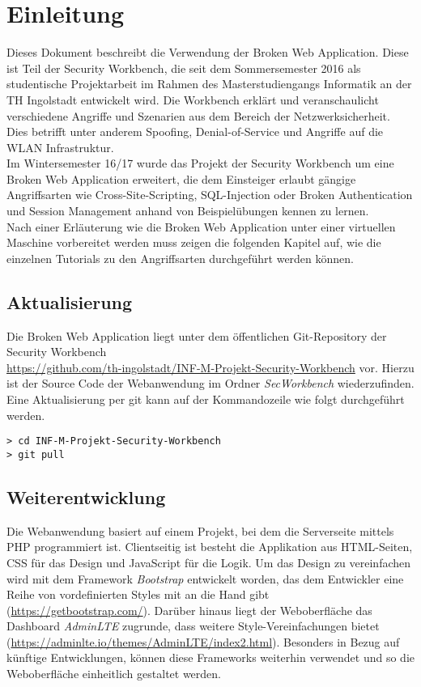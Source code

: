 \chapter{Einleitung}
Dieses Dokument beschreibt die Verwendung der Broken Web Application. Diese ist Teil der Security Workbench, die seit
dem Sommersemester 2016 als studentische Projektarbeit im Rahmen des Masterstudiengangs
Informatik an der TH Ingolstadt entwickelt wird. Die Workbench
erklärt und veranschaulicht verschiedene Angriffe und Szenarien aus dem Bereich
der Netzwerksicherheit. Dies betrifft unter anderem Spoofing, Denial-of-Service
und Angriffe auf die WLAN Infrastruktur. \\ 
Im Wintersemester 16/17 wurde das Projekt der Security Workbench um eine Broken Web Application erweitert, die dem Einsteiger erlaubt gängige Angriffsarten wie Cross-Site-Scripting, SQL-Injection oder Broken Authentication und Session Management anhand von Beispielübungen kennen zu lernen. \\ 
Nach einer Erläuterung wie die Broken Web Application unter einer virtuellen Maschine vorbereitet werden muss zeigen die folgenden Kapitel auf, wie die einzelnen Tutorials zu den Angriffsarten durchgeführt werden können. 

\section{Aktualisierung}

Die Broken Web Application liegt unter dem öffentlichen Git-Repository der Security Workbench \\ \url{https://github.com/th-ingolstadt/INF-M-Projekt-Security-Workbench} vor. Hierzu ist der Source Code der Webanwendung im Ordner \textit{SecWorkbench} wiederzufinden. Eine Aktualisierung per git kann auf der Kommandozeile wie folgt durchgeführt werden.

\begin{lstlisting}
> cd INF-M-Projekt-Security-Workbench
> git pull
\end{lstlisting}

\section{Weiterentwicklung} 
Die Webanwendung basiert auf einem Projekt, bei dem die Serverseite mittels PHP programmiert ist. Clientseitig ist besteht die Applikation aus HTML-Seiten, CSS für das Design und JavaScript für die Logik. Um das Design zu vereinfachen wird mit dem Framework \textit{Bootstrap} entwickelt worden, das dem Entwickler eine Reihe von vordefinierten Styles mit an die Hand gibt (\url{https://getbootstrap.com/}). Darüber hinaus liegt der Weboberfläche das Dashboard \textit{AdminLTE} zugrunde, dass weitere Style-Vereinfachungen bietet (\url{https://adminlte.io/themes/AdminLTE/index2.html}). Besonders in Bezug auf künftige Entwicklungen, können diese Frameworks weiterhin verwendet und so die Weboberfläche einheitlich gestaltet werden.  



